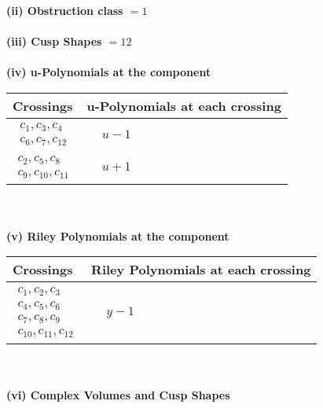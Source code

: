 \documentclass[1p]{elsarticle_modified}
\theoremstyle{definition}
\begin{document}
\flushleft \textbf{(ii) Obstruction class $= 1$}\\~\\
\flushleft \textbf{(iii) Cusp Shapes $= 12$}\\~\\
\newpage\renewcommand{\arraystretch}{1}
\flushleft \textbf{(iv) u-Polynomials at the component}\newline \\
\begin{tabular}{m{50pt}|m{274pt}}
Crossings & \hspace{64pt}u-Polynomials at each crossing \\
\hline $$\begin{aligned}c_{1},c_{3},c_{4}\\c_{6},c_{7},c_{12}\end{aligned}$$&$\begin{aligned}
&u-1
\end{aligned}$\\
\hline $$\begin{aligned}c_{2},c_{5},c_{8}\\c_{9},c_{10},c_{11}\end{aligned}$$&$\begin{aligned}
&u+1
\end{aligned}$\\
\hline
\end{tabular}\\~\\
\newpage\renewcommand{\arraystretch}{1}
\flushleft \textbf{(v) Riley Polynomials at the component}\newline \\
\begin{tabular}{m{50pt}|m{274pt}}
Crossings & \hspace{64pt}Riley Polynomials at each crossing \\
\hline $$\begin{aligned}c_{1},c_{2},c_{3}\\c_{4},c_{5},c_{6}\\c_{7},c_{8},c_{9}\\c_{10},c_{11},c_{12}\end{aligned}$$&$\begin{aligned}
&y-1
\end{aligned}$\\
\hline
\end{tabular}\\~\\
\newpage\flushleft \textbf{(vi) Complex Volumes and Cusp Shapes}
\end{document}
